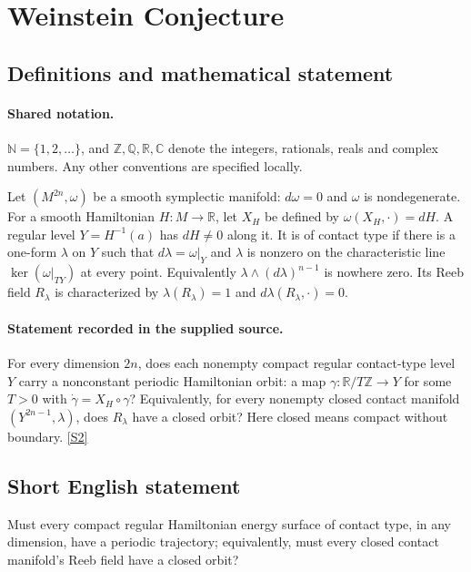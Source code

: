 \documentclass[11pt]{article}
\newcommand{\sref}[2]{\hyperlink{source:#1:#2}{[S#2]}}
\begin{document}
\section{Weinstein Conjecture}\label{statement}

\subsection{Definitions and mathematical statement}

\paragraph{Shared notation.}$\mathbb N=\{1,2,\ldots\}$, and $\mathbb Z,\mathbb Q,\mathbb R,\mathbb C$ denote the integers, rationals, reals and complex numbers. Any other conventions are specified locally.


Let $(M^{2n},\omega)$ be a smooth symplectic manifold: $d\omega=0$ and $\omega$ is nondegenerate. For a smooth Hamiltonian $H:M\to\mathbb R$, let $X_H$ be defined by $\omega(X_H,\cdot)=dH$. A regular level $Y=H^{-1}(a)$ has $dH\ne0$ along it. It is of contact type if there is a one-form $\lambda$ on $Y$ such that $d\lambda=\omega|_Y$ and $\lambda$ is nonzero on the characteristic line $\ker(\omega|_{TY})$ at every point. Equivalently $\lambda\wedge(d\lambda)^{n-1}$ is nowhere zero. Its Reeb field $R_\lambda$ is characterized by $\lambda(R_\lambda)=1$ and $d\lambda(R_\lambda,\cdot)=0$.
\paragraph{Statement recorded in the supplied source.}
For every dimension $2n$, does each nonempty compact regular contact-type level $Y$ carry a nonconstant periodic Hamiltonian orbit: a map $\gamma:\mathbb R/T\mathbb Z\to Y$ for some $T>0$ with $\dot\gamma=X_H\circ\gamma$? Equivalently, for every nonempty closed contact manifold $(Y^{2n-1},\lambda)$, does $R_\lambda$ have a closed orbit? Here closed means compact without boundary. \sref{statement}{2}
\subsection{Short English statement}
Must every compact regular Hamiltonian energy surface of contact type, in any dimension, have a periodic trajectory; equivalently, must every closed contact manifold’s Reeb field have a closed orbit?
\end{document}
